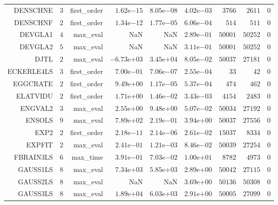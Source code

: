 \begin{longtable}{rrrrrrrrr}
DENSCHNE & \(     3\) & first\_order & \( 1.62\)e\(-15\) & \( 8.05\)e\(-08\) & \( 4.02\)e\(-03\) & \(  3766\) & \(  2611\) & \(     0\) \\
DENSCHNF & \(     2\) & first\_order & \( 1.34\)e\(-12\) & \( 1.77\)e\(-05\) & \( 6.06\)e\(-04\) & \(   514\) & \(   511\) & \(     0\) \\
DEVGLA1 & \(     4\) & max\_eval &       NaN &       NaN & \( 2.89\)e\(-01\) & \( 50001\) & \( 50252\) & \(     0\) \\
DEVGLA2 & \(     5\) & max\_eval &       NaN &       NaN & \( 3.11\)e\(-01\) & \( 50001\) & \( 50252\) & \(     0\) \\
DJTL & \(     2\) & max\_eval & \(-6.73\)e\(+03\) & \( 3.45\)e\(+04\) & \( 8.05\)e\(-02\) & \( 50037\) & \( 27181\) & \(     0\) \\
ECKERLE4LS & \(     3\) & first\_order & \( 7.00\)e\(-01\) & \( 7.06\)e\(-07\) & \( 2.55\)e\(-04\) & \(    33\) & \(    42\) & \(     0\) \\
EGGCRATE & \(     2\) & first\_order & \( 9.49\)e\(+00\) & \( 1.17\)e\(-05\) & \( 5.37\)e\(-04\) & \(   474\) & \(   462\) & \(     0\) \\
ELATVIDU & \(     2\) & first\_order & \( 1.71\)e\(+00\) & \( 1.46\)e\(-02\) & \( 3.43\)e\(-03\) & \(  4154\) & \(  2483\) & \(     0\) \\
ENGVAL2 & \(     3\) & max\_eval & \( 2.55\)e\(+00\) & \( 9.48\)e\(+00\) & \( 5.07\)e\(-02\) & \( 50034\) & \( 27192\) & \(     0\) \\
ENSOLS & \(     9\) & max\_eval & \( 7.89\)e\(+02\) & \( 2.19\)e\(-01\) & \( 3.94\)e\(+00\) & \( 50037\) & \( 27556\) & \(     0\) \\
EXP2 & \(     2\) & first\_order & \( 2.18\)e\(-11\) & \( 2.14\)e\(-06\) & \( 2.61\)e\(-02\) & \( 15037\) & \(  8334\) & \(     0\) \\
EXPFIT & \(     2\) & max\_eval & \( 2.41\)e\(-01\) & \( 1.21\)e\(-03\) & \( 8.46\)e\(-02\) & \( 50039\) & \( 27254\) & \(     0\) \\
FBRAIN3LS & \(     6\) & max\_time & \( 3.91\)e\(-01\) & \( 7.03\)e\(-02\) & \( 1.00\)e\(+01\) & \(  8782\) & \(  4973\) & \(     0\) \\
GAUSS1LS & \(     8\) & max\_eval & \( 7.34\)e\(+03\) & \( 5.85\)e\(+03\) & \( 2.89\)e\(+00\) & \( 50042\) & \( 27115\) & \(     0\) \\
GAUSS2LS & \(     8\) & max\_eval &       NaN &       NaN & \( 3.69\)e\(+00\) & \( 50136\) & \( 50308\) & \(     0\) \\
GAUSS3LS & \(     8\) & max\_eval & \( 1.89\)e\(+04\) & \( 6.03\)e\(+03\) & \( 2.91\)e\(+00\) & \( 50005\) & \( 27099\) & \(     0\) \\

\end{longtable}

